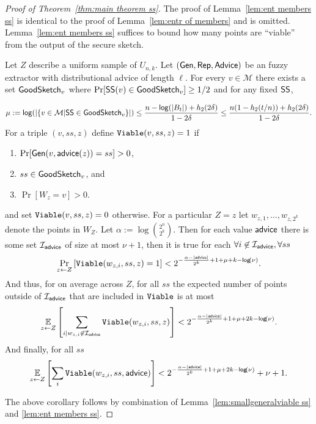 \begin{proof}[Proof of Theorem~\ref{thm:main theorem ss}]
The proof of Lemma~\ref{lem:ent members ss} is identical to the proof of Lemma~\ref{lem:entr of members} and is omitted. 
Lemma~\ref{lem:ent members ss} suffices to bound how many points are ``viable'' from the output of the secure sketch.


\begin{corollary}
\label{corollary:info loss ss}
Let $Z$ describe a uniform sample of $U_{n,k}$.  Let $({\mathsf{Gen}}, {\mathsf{Rep}}, {\mathsf{Advice}})$ be an fuzzy extractor with distributional advice of length $\ell$.       For every $v\in \mathcal{M}$ there exists a set $\mathsf{GoodSketch}_v$ where $\Pr[{\mathsf{SS}}(v)\in \mathsf{GoodSketch}_v] \ge 1/2$ and for any fixed ${\mathsf{SS}}$,
    
    \[
    \mu:=\mathsf{log}\!\left(|\{v \in \mathcal{M} | {\mathsf{SS}} \in \mathsf{GoodSketch}_v\}|\right) \le \frac{n - \mathsf{log}\!\left(|B_t|\right) +h_2(2\delta)}{1-2\delta} \le \frac{n(1-h_2(t/n)) +h_2(2\delta)}{1-2\delta}.
    \]
For a triple $(v, ss, z)$ define $\mathtt{Viable}(v, ss, z)=1$ if
\begin{enumerate}
\itemsep0em
\item $\Pr[{\mathsf{Gen}}(v, {\mathsf{advice}}(z)) = ss]>0$,
\item $ss\in\mathsf{GoodSketch}_v$, and
\item $\Pr[W_z = v]>0$.
\end{enumerate}
and set $\mathtt{Viable}(v, ss, z)=0$ otherwise. 
 For a particular $Z=z$ let $w_{z,1},..., w_{z,2^k}$ denote the points in $W_Z$. Let $\alpha:= \log {2^n\choose 2^k}$.  
 Then for each value ${\mathsf{advice}}$ there is some set $\mathcal{I}_{{\mathsf{advice}}}$ of size at most $\nu+1$, then it is true for each $\forall i\not \in \mathcal{I}_{\mathsf{advice}}, \forall ss$
\[
\Pr_{z\leftarrow Z}\left[\mathtt{Viable}(w_{z,i},ss,z) =1\right]< 2^{-\frac{\alpha-|{\mathsf{advice}}|}{2^k}+1+\mu + k-\mathsf{log}\!\left(\nu\right)}.
\]
And thus, for on average across $Z$, for all $ss$ the expected number of points outside of $\mathcal{I}_{\mathsf{advice}}$ that are included in $\mathtt{Viable}$ is at most 
\begin{align*}
\operatorname*{\mathbb{E}}_{z\leftarrow Z} \left[\sum_{i | w_{z,i}\not\in\mathcal{I}_{\mathsf{advice}}} \mathtt{Viable}(w_{z,i}, ss, z) \right]< 2^{-\frac{\alpha- |{\mathsf{advice}}|}{2^k}+1+\mu+2k-\mathsf{log}\!\left(\nu\right)}.
\end{align*}
And finally, for all $ss$
\begin{align*}
\operatorname*{\mathbb{E}}_{z\leftarrow Z} \left[\sum_{i }  \mathtt{Viable}(w_{z,i}, ss, {\mathsf{advice}})  \right]< 2^{-\frac{\alpha-|{\mathsf{advice}}|}{2^k}+1+\mu+2k-\mathsf{log}\!\left(\nu\right)}+\nu+1.
\end{align*}
\end{corollary}
\noindent
The above corollary follows by combination of Lemma~\ref{lem:smallgeneralviable ss} and \ref{lem:ent members ss}.
\end{proof}
